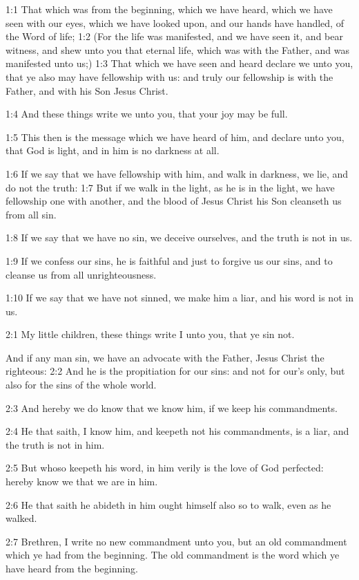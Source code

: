 

1:1 That which was from the beginning, which we have heard, which we
have seen with our eyes, which we have looked upon, and our hands have
handled, of the Word of life; 1:2 (For the life was manifested, and we
have seen it, and bear witness, and shew unto you that eternal life,
which was with the Father, and was manifested unto us;) 1:3 That which
we have seen and heard declare we unto you, that ye also may have
fellowship with us: and truly our fellowship is with the Father, and
with his Son Jesus Christ.

1:4 And these things write we unto you, that your joy may be full.

1:5 This then is the message which we have heard of him, and declare
unto you, that God is light, and in him is no darkness at all.

1:6 If we say that we have fellowship with him, and walk in darkness,
we lie, and do not the truth: 1:7 But if we walk in the light, as he
is in the light, we have fellowship one with another, and the blood of
Jesus Christ his Son cleanseth us from all sin.

1:8 If we say that we have no sin, we deceive ourselves, and the truth
is not in us.

1:9 If we confess our sins, he is faithful and just to forgive us our
sins, and to cleanse us from all unrighteousness.

1:10 If we say that we have not sinned, we make him a liar, and his
word is not in us.

2:1 My little children, these things write I unto you, that ye sin
not.

And if any man sin, we have an advocate with the Father, Jesus Christ
the righteous: 2:2 And he is the propitiation for our sins: and not
for our's only, but also for the sins of the whole world.

2:3 And hereby we do know that we know him, if we keep his
commandments.

2:4 He that saith, I know him, and keepeth not his commandments, is a
liar, and the truth is not in him.

2:5 But whoso keepeth his word, in him verily is the love of God
perfected: hereby know we that we are in him.

2:6 He that saith he abideth in him ought himself also so to walk,
even as he walked.

2:7 Brethren, I write no new commandment unto you, but an old
commandment which ye had from the beginning. The old commandment is
the word which ye have heard from the beginning.

